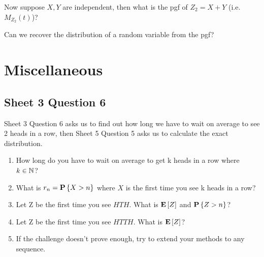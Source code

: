 \documentclass{article}
\begin{document}
Now suppose $X,Y$ are independent, then what is the pgf of $Z_2=X+Y$ (i.e. $M_{Z_2}(t)$)?

Can we recover the distribution of a random variable from the pgf?
\section{Miscellaneous}
\subsection{Sheet 3 Question 6}
Sheet 3 Question 6 asks us to find out how long we have to wait on average to see 2 heads in a row, then Sheet 5 Question 5 asks us to calculate the exact distribution.
\begin{enumerate}
    \item How long do you have to wait on average to get k heads in a row where $k\in{\mathbb N}$?
    \item What is $r_n={\mathbf P}\left\{X>n\right\}$ where $X$ is the first time you see k heads in a row?
    \item Let Z be the first time you see $HTH$. What is ${\mathbf E}\left[Z\right]$ and ${\mathbf P}\left\{Z>n\right\}$?
    \item Let Z be the first time you see $HTTH$. What is ${\mathbf E}\left[Z\right]$?
    \item If the challenge doesn't prove enough, try to extend your methods to any sequence.
\end{enumerate}
\end{document}
